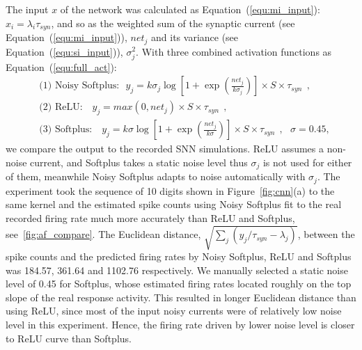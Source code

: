 \documentclass[runningheads,a4paper]{llncs}
\begin{document}
The input $x$ of the network was calculated as Equation~(\ref{equ:mi_input}): $x_i=\lambda_i\tau_{syn}$, and so as the weighted sum of the synaptic current (see Equation~(\ref{equ:mi_input})), $net_j$ and its variance (see Equation~(\ref{equ:si_input})), $\sigma^2_j$.
With three combined activation functions as Equation~(\ref{equ:full_act}):
\begin{equation}
\begin{aligned}
&\textrm{(1) Noisy Softplus:~~}  y_j=k \sigma_j \log [1 + \exp(\frac{net_j}{k \sigma_j})] \times S \times \tau_{syn}~~,  \\
&\textrm{(2) ReLU:~~ } y_j=max(0, net_j) \times S \times \tau_{syn}~~, \\
&\textrm{(3) Softplus:~~ } y_j=k \sigma \log [1 + \exp(\frac{net_j}{k \sigma})] \times S \times \tau_{syn}~~, ~~~\sigma=0.45,  
\end{aligned}
\end{equation}	
we compare the output to the recorded SNN simulations.
ReLU assumes a non-noise current, and Softplus takes a static noise level thus $\sigma_j$ is not used for either of them, meanwhile Noisy Softplus adapts to noise automatically with $\sigma_j$.
The experiment took the sequence of 10 digits shown in Figure~\ref{fig:cnn}(a) to the same kernel and the estimated spike counts using Noisy Softplus fit to the real recorded firing rate much more accurately than ReLU and Softplus,  see~\ref{fig:af_compare}.
The Euclidean distance, $\sqrt{\sum_{j}(y_j/\tau_{syn} - \lambda_j)}$, between the spike counts and the predicted firing rates by Noisy Softplus, ReLU and Softplus was 184.57, 361.64 and 1102.76 respectively.
We manually selected a static noise level of 0.45 for Softplus, whose estimated firing rates located roughly on the top slope of the real response activity.
This resulted in longer Euclidean distance than using ReLU, since most of the input noisy currents were of relatively low noise level in this experiment.
Hence, the firing rate driven by lower noise level is closer to ReLU curve than Softplus.
\end{document}
